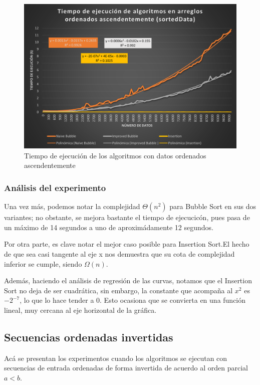 \documentclass[letter]{article}
\begin{document}
\begin{figure}[h]
    \centering
    \includegraphics[scale=0.9]{sortedDataGraphic.png}
    \caption{Tiempo de ejecución de los algoritmos con datos ordenados ascendentemente}
   \label{experimentos:ordenadas:grafica}
\end{figure}


\subsubsection{Análisis del experimento}
\label{experimentos:ordenadas:analisis}
Una vez más, podemos notar la complejidad $\Theta(n^2)$ para Bubble Sort en sus dos variantes; no obstante, se mejora bastante el tiempo de ejecucicón, pues pasa de un máximo de 14 segundos a uno de aproximádamente 12 segundos.

Por otra parte, es clave notar el mejor caso posible para Insertion Sort.El hecho de que sea casi tangente al eje x nos demuestra que su cota de complejidad inferior se cumple, siendo $\Omega(n)$.

Además, haciendo el análisis de regresión de las curvas, notamos que el Insertion Sort no deja de ser cuadrática, sin embargo, la constante que acompaña al $x^2$ es $-2^{-7}$, lo que lo hace tender a 0. Esto ocasiona que se convierta en una función lineal, muy cercana al eje horizontal de la gráfica.


\subsection{Secuencias ordenadas invertidas} \label{experimentos:invertidas}

Acá se presentan los experimentos cuando los algoritmos se ejecutan con secuencias de entrada ordenadas de forma invertida de acuerdo al orden parcial $a<b$.
\end{document}
